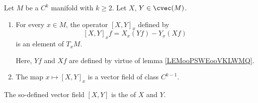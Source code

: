 \begin{propositionDef}      \label{DEFooHOTOooRaPwyo}
    Let \( M\) be a \( C^k\) manifold with \( k\geq 2\). Let $X$, $Y\in\cvec(M)$.
    \begin{enumerate}
        \item       \label{ITEMooZKKUooQjYftU}
    For every \( x\in M\), the operator \( [X,Y]_x\) defined by
    \begin{equation}        \label{EQooDSKWooXdjPPP}
      [X,Y]_xf=X_x(Yf)-Y_x(Xf)
    \end{equation}
    is an element of \( T_xM\).

    Here, \( Yf\) and \( Xf\) are defined by virtue of lemma \ref{LEMooPSWEooVKLWMQ}.
\item       \label{ITEMooPGPLooQrKxWY}
    The map \( x\mapsto [X,Y]_x\) is a vector field of class \( C^{k-1}\).
    \end{enumerate}

    The so-defined vector field \( [X,Y]\) is the  of \( X\) and \( Y\).
\end{propositionDef}

